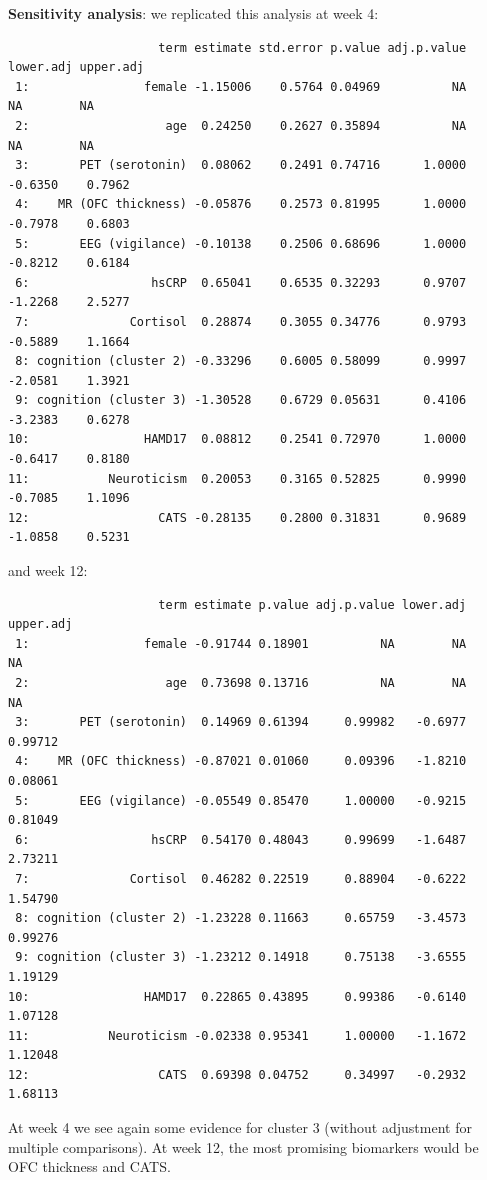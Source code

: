 \documentclass[12pt]{article}
\begin{document}
\textbf{Sensitivity analysis}: we replicated this analysis at week 4:
\label{}
\begin{verbatim}
                     term estimate std.error p.value adj.p.value lower.adj upper.adj
 1:                female -1.15006    0.5764 0.04969          NA        NA        NA
 2:                   age  0.24250    0.2627 0.35894          NA        NA        NA
 3:       PET (serotonin)  0.08062    0.2491 0.74716      1.0000   -0.6350    0.7962
 4:    MR (OFC thickness) -0.05876    0.2573 0.81995      1.0000   -0.7978    0.6803
 5:       EEG (vigilance) -0.10138    0.2506 0.68696      1.0000   -0.8212    0.6184
 6:                 hsCRP  0.65041    0.6535 0.32293      0.9707   -1.2268    2.5277
 7:              Cortisol  0.28874    0.3055 0.34776      0.9793   -0.5889    1.1664
 8: cognition (cluster 2) -0.33296    0.6005 0.58099      0.9997   -2.0581    1.3921
 9: cognition (cluster 3) -1.30528    0.6729 0.05631      0.4106   -3.2383    0.6278
10:                HAMD17  0.08812    0.2541 0.72970      1.0000   -0.6417    0.8180
11:           Neuroticism  0.20053    0.3165 0.52825      0.9990   -0.7085    1.1096
12:                  CATS -0.28135    0.2800 0.31831      0.9689   -1.0858    0.5231
\end{verbatim}

and week 12:
\label{}
\begin{verbatim}
                     term estimate p.value adj.p.value lower.adj upper.adj
 1:                female -0.91744 0.18901          NA        NA        NA
 2:                   age  0.73698 0.13716          NA        NA        NA
 3:       PET (serotonin)  0.14969 0.61394     0.99982   -0.6977   0.99712
 4:    MR (OFC thickness) -0.87021 0.01060     0.09396   -1.8210   0.08061
 5:       EEG (vigilance) -0.05549 0.85470     1.00000   -0.9215   0.81049
 6:                 hsCRP  0.54170 0.48043     0.99699   -1.6487   2.73211
 7:              Cortisol  0.46282 0.22519     0.88904   -0.6222   1.54790
 8: cognition (cluster 2) -1.23228 0.11663     0.65759   -3.4573   0.99276
 9: cognition (cluster 3) -1.23212 0.14918     0.75138   -3.6555   1.19129
10:                HAMD17  0.22865 0.43895     0.99386   -0.6140   1.07128
11:           Neuroticism -0.02338 0.95341     1.00000   -1.1672   1.12048
12:                  CATS  0.69398 0.04752     0.34997   -0.2932   1.68113
\end{verbatim}

At week 4 we see again some evidence for cluster 3 (without adjustment
for multiple comparisons). At week 12, the most promising biomarkers
would be OFC thickness and CATS.
\end{document}
